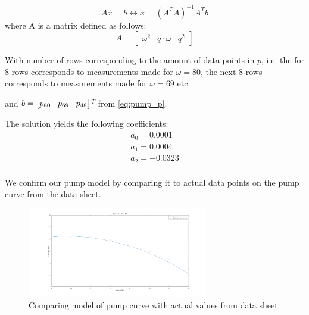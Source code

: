\begin{equation}
	Ax = b \leftrightarrow x = (A^TA)^{-1}A^Tb
\end{equation}
where A is a matrix defined as follows:
\begin{equation}
	A = \begin{bmatrix}
			\omega^2 & q \cdot \omega & q^2
			\end{bmatrix}
\end{equation}

With number of rows corresponding to the amount of data points in $ p $, i.e. the for 8 rows corresponds to measurements made for $ \omega = 80$, the next 8 rows corresponds to measurements made for $ \omega = 69 $ etc.  

and $ b = \begin{bmatrix}
	p_{80} \hspace{0.3cm} p_{69} \hspace{0.3cm} p_{48}
\end{bmatrix} $$ ^T $ from \cref{eq:pump_p}.

The solution yields the following coefficients:
\begin{equation}
	\begin{split}
		a_0 = 0.0001 \\
		a_1 = 0.0004 \\
		a_2 = -0.0323 \\
	\end{split}
\end{equation}

We confirm our pump model by comparing it to actual data points on the pump curve from the data sheet.
\begin{figure}[h!]
	\centering
	\includegraphics[width=0.7\textwidth]{Pictures/Pumpcurve_69.png}
	\caption{Comparing model of pump curve with actual values from data sheet}
	\label{fig:Pumpcurve_69}
\end{figure}








